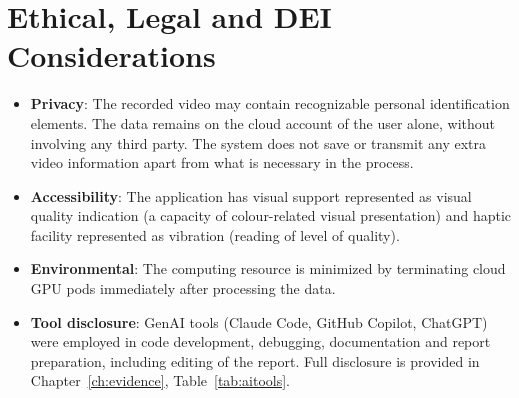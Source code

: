 \section{Ethical, Legal and DEI Considerations}
\begin{itemize}
    \item \textbf{Privacy}: The recorded video may contain recognizable personal identification elements. The data remains on the cloud account of the user alone, without involving any third party. The system does not save or transmit any extra video information apart from what is necessary in the process.
    \item \textbf{Accessibility}: The application has visual support represented as visual quality indication (a capacity of colour-related visual presentation) and haptic facility represented as vibration (reading of level of quality).
    \item \textbf{Environmental}: The computing resource is minimized by terminating cloud GPU pods immediately after processing the data.
    \item \textbf{Tool disclosure}: GenAI tools (Claude Code, GitHub Copilot, ChatGPT) were employed in code development, debugging, documentation and report preparation, including editing of the report. Full disclosure is provided in Chapter~\ref{ch:evidence}, Table~\ref{tab:aitools}.
\end{itemize}

